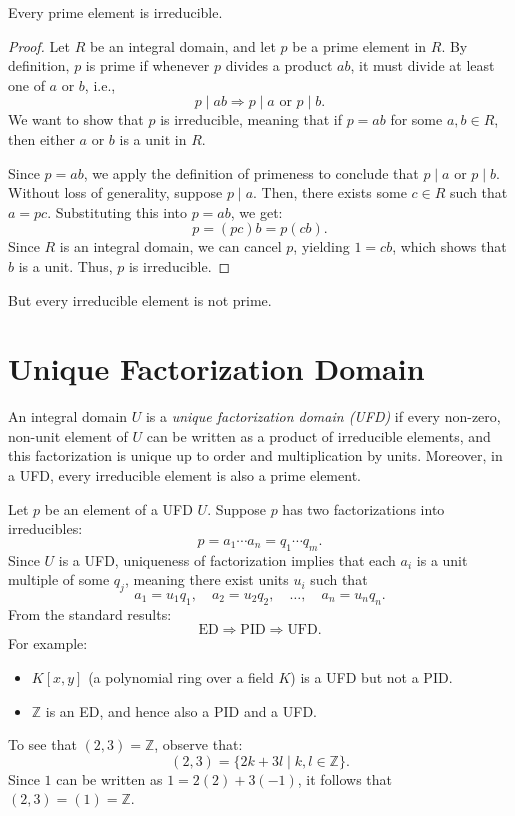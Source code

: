 \begin{theorem}
    Every prime element is irreducible.
\end{theorem}
\begin{proof}
    Let \( R \) be an integral domain, and let \( p \) be a prime element in \( R \). By definition, \( p \) is prime if whenever \( p \) divides a product \( ab \), it must divide at least one of \( a \) or \( b \), i.e.,  
\[
p \mid ab \Rightarrow p \mid a \text{ or } p \mid b.
\]  
We want to show that \( p \) is irreducible, meaning that if \( p = ab \) for some \( a, b \in R \), then either \( a \) or \( b \) is a unit in \( R \).  

Since \( p = ab \), we apply the definition of primeness to conclude that \( p \mid a \) or \( p \mid b \). Without loss of generality, suppose \( p \mid a \). Then, there exists some \( c \in R \) such that \( a = pc \). Substituting this into \( p = ab \), we get:  
\[
p = (pc)b = p(cb).
\]  
Since \( R \) is an integral domain, we can cancel \( p \), yielding \( 1 = cb \), which shows that \( b \) is a unit. Thus, \( p \) is irreducible.
\end{proof}
But every irreducible element is not prime.
\section{Unique Factorization Domain}
\begin{definition}
    An integral domain \( U \) is a \textit{unique factorization domain (UFD)} if every non-zero, non-unit element of \( U \) can be written as a product of irreducible elements, and this factorization is unique up to order and multiplication by units. 
    Moreover, in a UFD, every irreducible element is also a prime element.
    \end{definition}
    Let \( p \) be an element of a UFD \( U \). Suppose \( p \) has two factorizations into irreducibles:
    \[
    p = a_1 \cdots a_n = q_1 \cdots q_m.
    \]
    Since \( U \) is a UFD, uniqueness of factorization implies that each \( a_i \) is a unit multiple of some \( q_j \), meaning there exist units \( u_i \) such that
    \[
    a_1 = u_1 q_1, \quad a_2 = u_2 q_2, \quad \dots, \quad a_n = u_n q_n.
    \]
    From the standard results:
    \[
    \text{ED} \Rightarrow \text{PID} \Rightarrow \text{UFD}.
    \]
    For example:
    \begin{itemize}
        \item \( K[x,y] \) (a polynomial ring over a field \( K \)) is a UFD but not a PID.
        \item \( \mathbb{Z} \) is an ED, and hence also a PID and a UFD.
    \end{itemize}
    To see that \( (2,3) = \mathbb{Z} \), observe that:
    \[
    (2,3) = \{ 2k + 3l \mid k, l \in \mathbb{Z} \}.
    \]
    Since \( 1 \) can be written as \( 1 = 2(2) + 3(-1) \), it follows that \( (2,3) = (1) = \mathbb{Z} \).